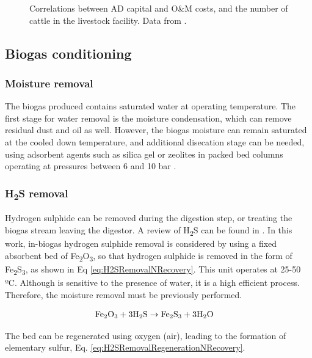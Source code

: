 \begin{refsection}[referencesApD]
\begin{figure}[h!]
	\caption{Correlations between AD capital and O\&M costs, and the number of cattle in the livestock facility. Data from \protect\citet{USDA_OM}.}
	\label{fig:AD_size_2cost}
\end{figure}

\subsection{Biogas conditioning}\label{section:BiogasConditioningNRecovery}
\subsubsection{Moisture removal}
The biogas produced contains saturated water at operating temperature. The first stage for water removal is the moisture condensation, which can remove residual dust and oil as well. However, the biogas moisture can remain saturated at the cooled down temperature, and additional disecation stage can be needed, using adsorbent agents such as silica gel or zeolites in packed bed columns operating at pressures between 6 and 10 bar \citep{ryckebosch2011techniqu}.

\subsubsection{H\textsubscript{2}S removal}
Hydrogen sulphide can be removed during the digestion step, or treating the biogas stream leaving the digestor. A review of H\textsubscript{2}S can be found in \citet{ryckebosch2011techniqu}. In this work, in-biogas hydrogen sulphide removal is considered by using a fixed absorbent bed of Fe\textsubscript{2}O\textsubscript{3}, so that hydrogen sulphide is removed in the form of Fe\textsubscript{2}S\textsubscript{3}, as shown in Eq \ref{eq:H2SRemovalNRecovery}. This unit operates at 25-50 ºC. Although is sensitive to the presence of water, it is a high efficient process. Therefore, the moisture removal must be previously performed.

\begin{align}
& \text{Fe\textsubscript{2}O\textsubscript{3}} + 3\text{H\textsubscript{2}S} \rightarrow \text{Fe\textsubscript{2}S\textsubscript{3}} + 3\text{H\textsubscript{2}O} \label{eq:H2SRemovalNRecovery}
\end{align}

The bed can be regenerated using oxygen (air), leading to the formation of elementary sulfur, Eq. \ref{eq:H2SRemovalRegenerationNRecovery}.


\end{refsection}
